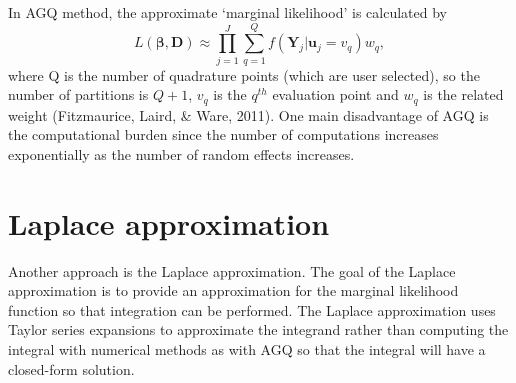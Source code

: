 \documentclass[12pt,oneside,a4paper]{reedthesis}
\begin{document}
In AGQ method, the approximate `marginal likelihood' is calculated by
\begin{equation} 
L(\boldsymbol{\beta}, \mathbf{D}) \approx \prod_{j=1}^{J} \sum_{q=1}^{Q} f\left(\mathbf{Y}_{j} | \mathbf{u}_{j}=v_{q}\right) w_{q},
\end{equation}
where Q is the number of quadrature points (which are user selected), so the number of partitions is \(Q+1\), \(v_{q}\) is the \(q^{th}\) evaluation point and \(w_{q}\) is the related weight (Fitzmaurice, Laird, \& Ware, 2011).
One main disadvantage of AGQ is the computational burden since the number of computations increases exponentially as the number of random effects increases.

\hypertarget{laplace-approximation}{%
\section{Laplace approximation}\label{laplace-approximation}}

Another approach is the Laplace approximation. The goal of the Laplace approximation is to provide an approximation for the marginal likelihood function so that integration can be performed. The Laplace approximation uses Taylor series expansions to approximate the integrand rather than computing the integral with numerical methods as with AGQ so that the integral will have a closed-form solution.
\end{document}
